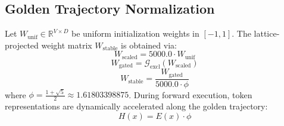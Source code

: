 \subsection{Golden Trajectory Normalization}
Let $W_{\text{unif}} \in \mathbb{R}^{V \times D}$ be uniform initialization weights in $[-1, 1]$. The lattice-projected weight matrix $W_{\text{stable}}$ is obtained via:
\begin{equation}
W_{\text{scaled}} = 5000.0 \cdot W_{\text{unif}}
\end{equation}
\begin{equation}
W_{\text{gated}} = \mathcal{G}_{\text{excl}}(W_{\text{scaled}})
\end{equation}
\begin{equation}
W_{\text{stable}} = \frac{W_{\text{gated}}}{5000.0 \cdot \phi}
\end{equation}
where $\phi = \frac{1+\sqrt{5}}{2} \approx 1.61803398875$. During forward execution, token representations are dynamically accelerated along the golden trajectory:
\begin{equation}
H(x) = E(x) \cdot \phi
\end{equation}
